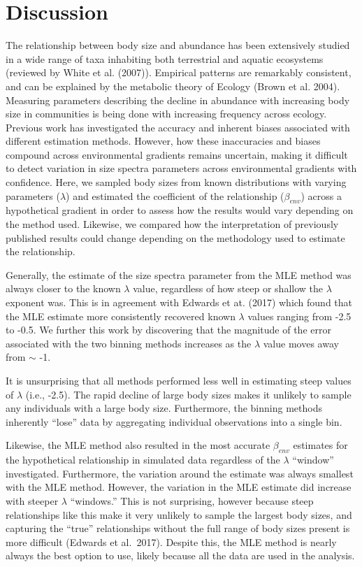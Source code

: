\documentclass[
]{article}
\begin{document}
\hypertarget{discussion}{%
\section{Discussion}\label{discussion}}

The relationship between body size and abundance has been extensively
studied in a wide range of taxa inhabiting both terrestrial and aquatic
ecosystems (reviewed by White et al. (2007)). Empirical patterns are
remarkably consistent, and can be explained by the metabolic theory of
Ecology (Brown et al. 2004). Measuring parameters describing the decline
in abundance with increasing body size in communities is being done with
increasing frequency across ecology. Previous work has investigated the
accuracy and inherent biases associated with different estimation
methods. However, how these inaccuracies and biases compound across
environmental gradients remains uncertain, making it difficult to detect
variation in size spectra parameters across environmental gradients with
confidence. Here, we sampled body sizes from known distributions with
varying parameters (\(\lambda\)) and estimated the coefficient of the
relationship (\(\beta_{env}\)) across a hypothetical gradient in order
to assess how the results would vary depending on the method used.
Likewise, we compared how the interpretation of previously published
results could change depending on the methodology used to estimate the
relationship.

Generally, the estimate of the size spectra parameter from the MLE
method was always closer to the known \(\lambda\) value, regardless of
how steep or shallow the \(\lambda\) exponent was. This is in agreement
with Edwards et at. (2017) which found that the MLE estimate more
consistently recovered known \(\lambda\) values ranging from -2.5 to
-0.5. We further this work by discovering that the magnitude of the
error associated with the two binning methods increases as the
\(\lambda\) value moves away from \(\sim\) -1.

It is unsurprising that all methods performed less well in estimating
steep values of \(\lambda\) (i.e., -2.5). The rapid decline of large
body sizes makes it unlikely to sample any individuals with a large body
size. Furthermore, the binning methods inherently ``lose'' data by
aggregating individual observations into a single bin.

Likewise, the MLE method also resulted in the most accurate
\(\beta_{env}\) estimates for the hypothetical relationship in simulated
data regardless of the \(\lambda\) ``window'' investigated. Furthermore,
the variation around the estimate was always smallest with the MLE
method. However, the variation in the MLE estimate did increase with
steeper \(\lambda\) ``windows.'' This is not surprising, however because
steep relationships like this make it very unlikely to sample the
largest body sizes, and capturing the ``true'' relationships without the
full range of body sizes present is more difficult (Edwards et
al.~2017). Despite this, the MLE method is nearly always the best option
to use, likely because all the data are used in the analysis.
\end{document}
